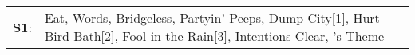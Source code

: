 \begin{supertabular}{p{0.03\textwidth}p{0.92\textwidth}}
 \textbf{S1}:  &  Eat\textsuperscript{}, \enspace Words\textsuperscript{}, \enspace Bridgeless\textsuperscript{}, \enspace Partyin' Peeps\textsuperscript{}, \enspace Dump City[1]\textsuperscript{}, \enspace Hurt Bird Bath[2]\textsuperscript{}, \enspace Fool in the Rain[3]\textsuperscript{}, \enspace Intentions Clear\textsuperscript{}, 's Theme\textsuperscript{}  \enspace  \\
\end{supertabular}

